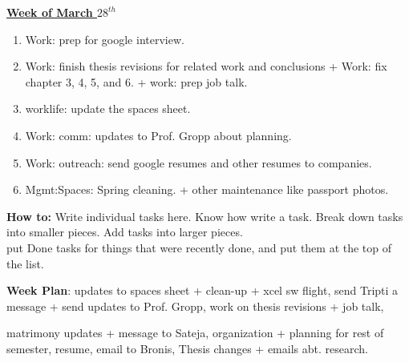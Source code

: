 \documentclass[serif, mathserif, final]{beamer}
\begin{document}
{\small \underline{\textbf{Week of March $28^{th}$}}}\\  
\begin{enumerate} 
\small \item \small Work: prep for google interview. 
\small \item \small Work: finish thesis revisions for related work and
conclusions + Work: fix chapter 3, 4, 5, and 6. + work: prep job
talk. 
\item \small worklife: update the spaces sheet. 
\small \item \small Work: comm: updates to Prof. Gropp about planning.  
\small \item \small Work: outreach:  send google resumes and other resumes to
companies. 
\item \small Mgmt:Spaces: Spring cleaning. + other maintenance like
  passport photos.  
\end{enumerate} 

\newpage 
\textbf{How to:} Write individual tasks here. Know how write a task. 
Break down tasks into smaller pieces. Add tasks into larger
pieces. \\ put Done tasks for things that were recently done, and put
them at the top of the list.


\textbf{Week Plan}: updates to spaces sheet + clean-up +  xcel sw
flight, send Tripti a message + send updates to Prof. Gropp, work on
thesis revisions + job talk, 

 matrimony updates + message to Sateja,
organization + planning for rest of semester, resume, email to Bronis,
Thesis changes + emails abt. research. 


\end{document}
